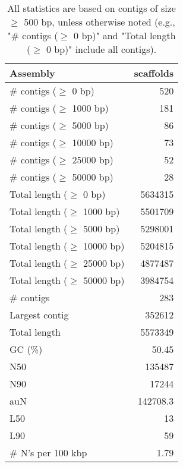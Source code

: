\documentclass[12pt,a4paper]{article}
\begin{document}
\begin{table}[ht]
\begin{center}
\caption{All statistics are based on contigs of size $\geq$ 500 bp, unless otherwise noted (e.g., "\# contigs ($\geq$ 0 bp)" and "Total length ($\geq$ 0 bp)" include all contigs).}
\begin{tabular}{|l*{1}{|r}|}
\hline
Assembly & scaffolds \\ \hline
\# contigs ($\geq$ 0 bp) & 520 \\ \hline
\# contigs ($\geq$ 1000 bp) & 181 \\ \hline
\# contigs ($\geq$ 5000 bp) & 86 \\ \hline
\# contigs ($\geq$ 10000 bp) & 73 \\ \hline
\# contigs ($\geq$ 25000 bp) & 52 \\ \hline
\# contigs ($\geq$ 50000 bp) & 28 \\ \hline
Total length ($\geq$ 0 bp) & 5634315 \\ \hline
Total length ($\geq$ 1000 bp) & 5501709 \\ \hline
Total length ($\geq$ 5000 bp) & 5298001 \\ \hline
Total length ($\geq$ 10000 bp) & 5204815 \\ \hline
Total length ($\geq$ 25000 bp) & 4877487 \\ \hline
Total length ($\geq$ 50000 bp) & 3984754 \\ \hline
\# contigs & 283 \\ \hline
Largest contig & 352612 \\ \hline
Total length & 5573349 \\ \hline
GC (\%) & 50.45 \\ \hline
N50 & 135487 \\ \hline
N90 & 17244 \\ \hline
auN & 142708.3 \\ \hline
L50 & 13 \\ \hline
L90 & 59 \\ \hline
\# N's per 100 kbp & 1.79 \\ \hline
\end{tabular}
\end{center}
\end{table}
\end{document}
